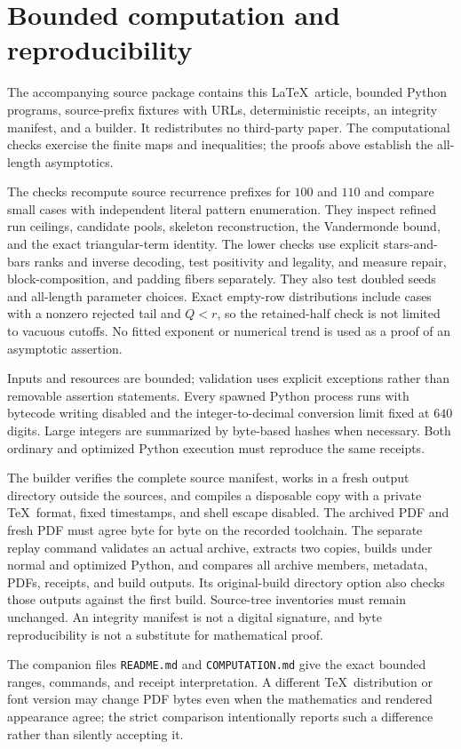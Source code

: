 \section{Bounded computation and reproducibility}\label{sec:computation}
The accompanying source package contains this \LaTeX\ article, bounded Python programs, source-prefix fixtures with URLs, deterministic receipts, an integrity manifest, and a builder. It redistributes no third-party paper. The computational checks exercise the finite maps and inequalities; the proofs above establish the all-length asymptotics.

The checks recompute source recurrence prefixes for $100$ and $110$ and compare small cases with independent literal pattern enumeration. They inspect refined run ceilings, candidate pools, skeleton reconstruction, the Vandermonde bound, and the exact triangular-term identity. The lower checks use explicit stars-and-bars ranks and inverse decoding, test positivity and legality, and measure repair, block-composition, and padding fibers separately. They also test doubled seeds and all-length parameter choices. Exact empty-row distributions include cases with a nonzero rejected tail and $Q<r$, so the retained-half check is not limited to vacuous cutoffs. No fitted exponent or numerical trend is used as a proof of an asymptotic assertion.

Inputs and resources are bounded; validation uses explicit exceptions rather than removable assertion statements. Every spawned Python process runs with bytecode writing disabled and the integer-to-decimal conversion limit fixed at $640$ digits. Large integers are summarized by byte-based hashes when necessary. Both ordinary and optimized Python execution must reproduce the same receipts.

The builder verifies the complete source manifest, works in a fresh output directory outside the sources, and compiles a disposable copy with a private \TeX\ format, fixed timestamps, and shell escape disabled. The archived PDF and fresh PDF must agree byte for byte on the recorded toolchain. The separate replay command validates an actual archive, extracts two copies, builds under normal and optimized Python, and compares all archive members, metadata, PDFs, receipts, and build outputs. Its original-build directory option also checks those outputs against the first build. Source-tree inventories must remain unchanged. An integrity manifest is not a digital signature, and byte reproducibility is not a substitute for mathematical proof.

The companion files \texttt{README.md} and \texttt{COMPUTATION.md} give the exact bounded ranges, commands, and receipt interpretation. A different \TeX\ distribution or font version may change PDF bytes even when the mathematics and rendered appearance agree; the strict comparison intentionally reports such a difference rather than silently accepting it.
